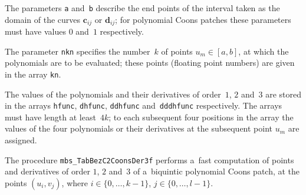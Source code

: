 The parameters \texttt{a} and~\texttt{b} describe the end points of the
interval taken as the domain of the curves $\bm{c}_{ij}$ or $\bm{d}_{ij}$;
for polynomial Coons patches these parameters must have values
$0$ and~$1$ respectively.

The parameter \texttt{nkn} specifies the number~$k$ of points $u_m\in[a,b]$,
at which the polynomials are to be evaluated; these points
(floating point numbers) are given in the array \texttt{kn}.

The values of the polynomials and their derivatives of order~$1$, $2$
and~$3$ are stored in the arrays \texttt{hfunc}, \texttt{dhfunc},
\texttt{ddhfunc} and~\texttt{dddhfunc} respectively.
The arrays must have length at least~$4k$; to each subsequent four positions
in the array the values of the four polynomials or their derivatives at
the subsequent point $u_m$ are assigned.

\vspace{\bigskipamount}
The procedure \texttt{mbs\_TabBezC2CoonsDer3f} performs a~fast computation
of points and derivatives of order $1$, $2$ and~$3$ of a~biquintic polynomial
Coons patch, at the points $(u_i,v_j)$, where $i\in\{0,\ldots,k-1\}$,
$j\in\{0,\ldots,l-1\}$.

